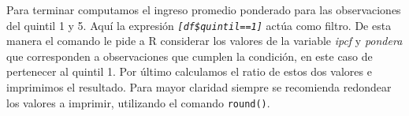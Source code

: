 \documentclass[
]{book}
\newenvironment{Shaded}{\begin{snugshade}}{\end{snugshade}}
\newcommand{\DecValTok}[1]{\textcolor[rgb]{0.00,0.00,0.81}{#1}}
\newcommand{\FloatTok}[1]{\textcolor[rgb]{0.00,0.00,0.81}{#1}}
\newcommand{\FunctionTok}[1]{\textcolor[rgb]{0.00,0.00,0.00}{#1}}
\newcommand{\NormalTok}[1]{#1}
\newcommand{\OtherTok}[1]{\textcolor[rgb]{0.56,0.35,0.01}{#1}}
\newcommand{\SpecialCharTok}[1]{\textcolor[rgb]{0.00,0.00,0.00}{#1}}
\begin{document}
\begin{Shaded}
\end{Shaded}

Para terminar computamos el ingreso promedio ponderado para las observaciones del quintil 1 y 5. Aquí la expresión \emph{\texttt{{[}df\$quintil==1{]}}} actúa como filtro. De esta manera el comando le pide a R considerar los valores de la variable \emph{ipcf} y \emph{pondera} que corresponden a observaciones que cumplen la condición, en este caso de pertenecer al quintil 1. Por último calculamos el ratio de estos dos valores e imprimimos el resultado. Para mayor claridad siempre se recomienda redondear los valores a imprimir, utilizando el comando \texttt{round()}.
\end{document}
